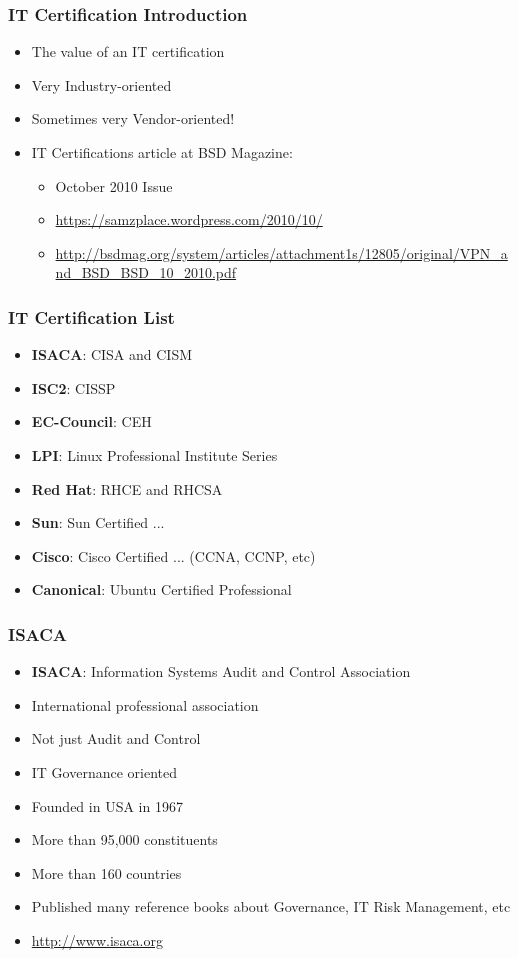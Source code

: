 \documentclass{beamer}
\begin{document}
\begin{frame}
\frametitle{IT Certification Introduction}
\begin{itemize}
\item The value of an IT certification
\item Very Industry-oriented
\item Sometimes very Vendor-oriented!
\item IT Certifications article at BSD Magazine:
\begin{itemize}
\item October 2010 Issue
\item \url{https://samzplace.wordpress.com/2010/10/}
\item \url{http://bsdmag.org/system/articles/attachment1s/12805/original/VPN_and_BSD_BSD_10_2010.pdf}
\end{itemize}
\end{itemize}
\end{frame}




\begin{frame}
\frametitle{IT Certification List}
\begin{itemize}
\item {\bf ISACA}: CISA and CISM
\item {\bf ISC2}: CISSP
\item {\bf EC-Council}: CEH
\item {\bf LPI}: Linux Professional Institute Series
\item {\bf Red Hat}: RHCE and RHCSA
\item {\bf Sun}: Sun Certified ... 
\item {\bf Cisco}: Cisco Certified ... (CCNA, CCNP, etc)
\item {\bf Canonical}: Ubuntu Certified Professional
\end{itemize}
\end{frame}


\begin{frame}
\frametitle{ISACA}
\begin{itemize}
\item {\bf ISACA}: Information Systems Audit and Control Association
\item International professional association
\item Not just Audit and Control
\item IT Governance oriented
\item Founded in USA in 1967
\item More than 95,000 constituents 
\item More than 160 countries
\item Published many reference books about Governance, IT Risk Management, etc
\item \url{http://www.isaca.org}
\end{itemize}
\end{frame}
\end{document}
